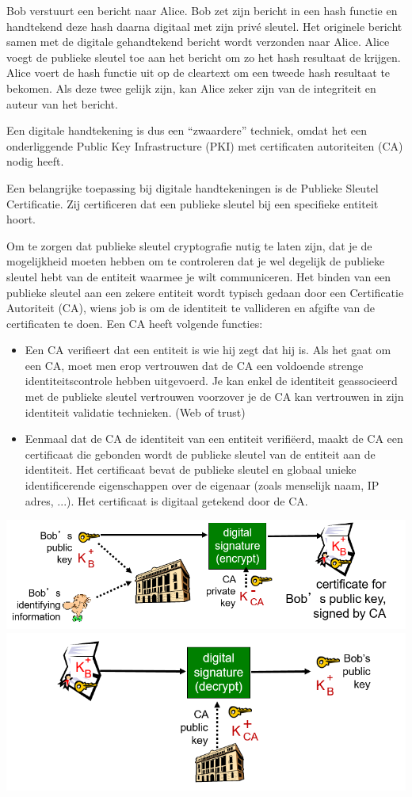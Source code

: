 Bob verstuurt een bericht naar Alice. Bob zet zijn bericht in een hash functie en handtekend deze hash daarna digitaal met zijn privé sleutel. Het originele bericht samen met de digitale gehandtekend bericht wordt verzonden naar Alice. Alice voegt de publieke sleutel toe aan het bericht om zo het hash resultaat de krijgen. Alice voert de hash functie uit op de cleartext om een tweede hash resultaat te bekomen. Als deze twee gelijk zijn, kan Alice zeker zijn van de integriteit en auteur van het bericht.

Een digitale handtekening is dus een “zwaardere” techniek, omdat het een onderliggende Public Key Infrastructure (PKI) met certificaten autoriteiten (CA) nodig heeft.


Een belangrijke toepassing bij digitale handtekeningen is de Publieke Sleutel Certificatie. Zij certificeren dat een publieke sleutel bij een specifieke entiteit hoort.

Om te zorgen dat publieke sleutel cryptografie nutig te laten zijn, dat je de mogelijkheid moeten hebben om te controleren dat je wel degelijk de publieke sleutel hebt van de entiteit waarmee je wilt communiceren. Het binden van een publieke sleutel aan een zekere entiteit wordt typisch gedaan door een Certificatie Autoriteit (CA), wiens job is om de identiteit te vallideren en afgifte van de certificaten te doen. Een CA heeft volgende functies:
\begin{itemize}
\item Een CA verifieert dat een entiteit is wie hij zegt dat hij is. Als het gaat om een CA, moet men erop vertrouwen dat de CA een voldoende strenge identiteitscontrole hebben uitgevoerd. Je kan enkel de identiteit geassocieerd met de publieke sleutel vertrouwen voorzover je de CA kan vertrouwen in zijn identiteit validatie technieken. (Web of trust)
\item Eenmaal dat de CA de identiteit van een entiteit verifiëerd, maakt de CA een certificaat die gebonden wordt de publieke sleutel van de entiteit aan de identiteit. Het certificaat bevat de publieke sleutel en globaal unieke identificerende eigenschappen over de eigenaar (zoals menselijk naam, IP adres, ...). Het certificaat is digitaal getekend door de CA.
\end{itemize}

\includegraphics[width=7in]{./img/imghfdst8/hfdst8puntje11.png}\\[1cm]



\includegraphics[width=7in]{./img/imghfdst8/hfdst8puntje12.png}\\[1cm]